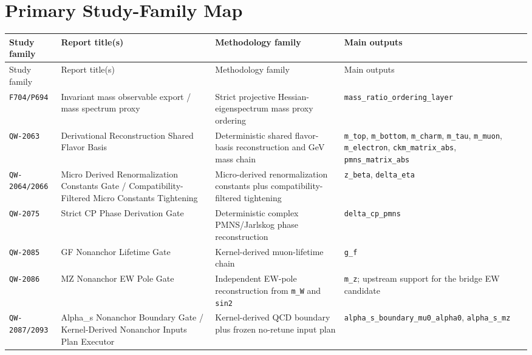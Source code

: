 \documentclass[11pt,a4paper]{article}
\begin{document}
\section{Primary Study-Family Map}

\newcommand{\dimlessunit}{\shortstack[l]{\texttt{dimension-}\\\texttt{less}}}
\setlength{\tabcolsep}{3pt}
\small
\begin{longtable}{@{}p{1.9cm}p{4.0cm}p{5.0cm}p{4.1cm}@{}}
\toprule
Study family & Report title(s) & Methodology family & Main outputs \\
\midrule
\endfirsthead
\toprule
Study family & Report title(s) & Methodology family & Main outputs \\
\midrule
\endhead
\texttt{F704/P694} &
Invariant mass observable export / mass spectrum proxy &
Strict projective Hessian-eigenspectrum mass proxy ordering &
\texttt{mass\_ratio\_ordering\_layer} \\

\texttt{QW-2063} &
Derivational Reconstruction Shared Flavor Basis &
Deterministic shared flavor-basis reconstruction and GeV mass chain &
\texttt{m\_top}, \texttt{m\_bottom}, \texttt{m\_charm}, \texttt{m\_tau}, \texttt{m\_muon}, \texttt{m\_electron}, \texttt{ckm\_matrix\_abs}, \texttt{pmns\_matrix\_abs} \\

\texttt{QW-2064/2066} &
Micro Derived Renormalization Constants Gate / Compatibility-Filtered Micro Constants Tightening &
Micro-derived renormalization constants plus compatibility-filtered tightening &
\texttt{z\_beta}, \texttt{delta\_eta} \\

\texttt{QW-2075} &
Strict CP Phase Derivation Gate &
Deterministic complex PMNS/Jarlskog phase reconstruction &
\texttt{delta\_cp\_pmns} \\

\texttt{QW-2085} &
GF Nonanchor Lifetime Gate &
Kernel-derived muon-lifetime chain &
\texttt{g\_f} \\

\texttt{QW-2086} &
MZ Nonanchor EW Pole Gate &
Independent EW-pole reconstruction from \texttt{m\_W} and \texttt{sin2} &
\texttt{m\_z}; upstream support for the bridge EW candidate \\

\texttt{QW-2087/2093} &
Alpha\_s Nonanchor Boundary Gate / Kernel-Derived Nonanchor Inputs Plan Executor &
Kernel-derived QCD boundary plus frozen no-retune input plan &
\texttt{alpha\_s\_boundary\_mu0\_alpha0}, \texttt{alpha\_s\_mz} \\


\end{longtable}
\end{document}
